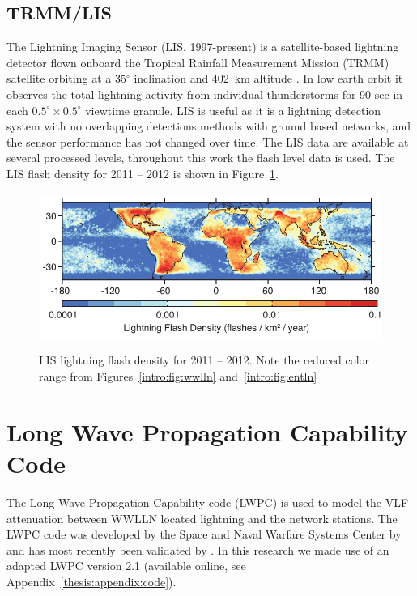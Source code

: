 \subsection{TRMM/LIS}

The Lightning Imaging Sensor (LIS, 1997-present) is a satellite-based lightning detector flown onboard the Tropical Rainfall Measurement Mission (TRMM) satellite orbiting at a 35$^\circ$ inclination and 402~km altitude \citep{Christian1999}.
In low earth orbit it observes the total lightning activity from individual thunderstorms for 90 sec in each $0.5^\circ \times 0.5^\circ$ viewtime granule.
LIS is useful as it is a lightning detection system with no overlapping detections methods with ground based networks, and the sensor performance has not changed over time.
The LIS data are available at several processed levels, throughout this work the flash level data is used.
The LIS flash density for 2011 -- 2012 is shown in Figure~\ref{intro:fig:lis}.

\begin{figure}[ht!]
	\centering
	\includegraphics[scale=1]{Introduction/Figures/lis_density.pdf}\\
	\caption{LIS lightning flash density for 2011 -- 2012.
		     Note the reduced color range from Figures~\ref{intro:fig:wwlln} and~\ref{intro:fig:entln}}
	\label{intro:fig:lis}
\end{figure}

\section{Long Wave Propagation Capability Code}

The Long Wave Propagation Capability code (LWPC) is used to model the VLF attenuation between WWLLN located lightning and the network stations.
The LWPC code was developed by the Space and Naval Warfare Systems Center by \citet{Ferguson1998} and has most recently been validated by \citet{McRae2000d, Thomson2011}.
In this research we made use of an adapted LWPC version 2.1 (available online, see Appendix~\ref{thesis:appendix:code}).

